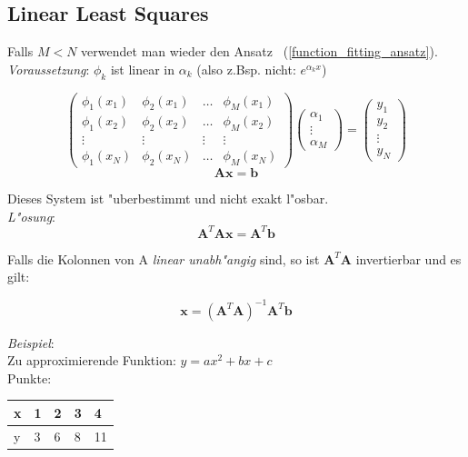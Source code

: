 \documentclass[german, 10pt, a4paper, twocolumn]{scrartcl}
\begin{document}
\subsection{Linear Least Squares}


Falls $M<N$ verwendet man wieder den Ansatz ~(\ref{function_fitting_ansatz}).\\
\textit{Voraussetzung}: $\phi_k$ ist linear in $\alpha_k$ (also z.Bsp. nicht: $e^{\alpha_k x}$)

\begin{displaymath}
\left (
\begin{array}{cccc}
 \phi_1(x_1) &	\phi_2(x_1) &	\ldots &	\phi_M(x_1)\\
 \phi_1(x_2) &	\phi_2(x_2) &	\ldots &	\phi_M(x_2)\\
 \vdots &	\vdots &	\vdots &	\vdots\\
 \phi_1(x_N) &	\phi_2(x_N) &	\ldots &	\phi_M(x_N)
\end{array}
\right )
\left(
\begin{array}{c}
 \alpha_1\\
 \vdots\\
 \alpha_M
\end{array}
\right ) =
\left (
\begin{array}{c}
 y_1\\
 y_2\\
 \vdots\\
 y_N
\end{array}
\right )
\end{displaymath}
\begin{displaymath}
	\mathbf{A}\mathbf{x}=\mathbf{b}
\end{displaymath}

Dieses System ist "uberbestimmt und nicht exakt l"osbar.\\

\textit{L"osung}:
\begin{displaymath}
	\mathbf{A}^T\mathbf{Ax}=\mathbf{A}^T\mathbf{b}
\end{displaymath}

Falls die Kolonnen von A \textit{linear unabh"angig} sind, so ist $\mathbf{A}^T\mathbf{A}$ invertierbar und es gilt:

\begin{displaymath}
	\mathbf{x}=(\mathbf{A}^T\mathbf{A})^{-1}\mathbf{A}^T\mathbf{b}
\end{displaymath}

\textit{Beispiel}:\\
Zu approximierende Funktion: $y=ax^2+bx+c$\\
Punkte:
\begin{tabular}[ht]{l|llll}
 x & 1 & 2 & 3 & 4\\ \hline
 y & 3 & 6 & 8 & 11
\end{tabular}
\end{document}
